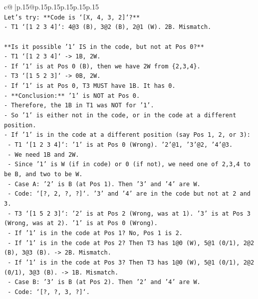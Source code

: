 \documentclass{article}
\begin{document}
{\begin{supertabular}{c@{$\;$}|p{.15\linewidth}@{}p{.15\linewidth}p{.15\linewidth}p{.15\linewidth}p{.15\linewidth}p{.15\linewidth}}
{{{\\ 
\texttt{Let's try: **Code is `{[}X, 4, 3, 2{]}`?**} \\
\texttt{{-} T1 `{[}1 2 3 4{]}`: 4@3 (B), 3@2 (B), 2@1 (W). 2B. Mismatch.} \\
\\ 
\texttt{**Is it possible '1' IS in the code, but not at Pos 0?**} \\
\texttt{{-} T1 `{[}1 2 3 4{]}` {-}> 1B, 2W.} \\
\texttt{{-} If '1' is at Pos 0 (B), then we have 2W from \{2,3,4\}.} \\
\texttt{{-} T3 `{[}1 5 2 3{]}` {-}> 0B, 2W.} \\
\texttt{{-} If '1' is at Pos 0, T3 MUST have 1B. It has 0.} \\
\texttt{{-} **Conclusion:** '1' is NOT at Pos 0.} \\
\texttt{{-} Therefore, the 1B in T1 was NOT for '1'.} \\
\texttt{{-} So '1' is either not in the code, or in the code at a different position.} \\
\texttt{{-} If '1' is in the code at a different position (say Pos 1, 2, or 3):} \\
\texttt{  {-} T1 `{[}1 2 3 4{]}`: '1' is at Pos 0 (Wrong). '2'@1, '3'@2, '4'@3.} \\
\texttt{  {-} We need 1B and 2W.} \\
\texttt{  {-} Since '1' is W (if in code) or 0 (if not), we need one of 2,3,4 to be B, and two to be W.} \\
\texttt{  {-} Case A: '2' is B (at Pos 1). Then '3' and '4' are W.} \\
\texttt{    {-} Code: `{[}?, 2, ?, ?{]}`. '3' and '4' are in the code but not at 2 and 3.} \\
\texttt{    {-} T3 `{[}1 5 2 3{]}`: '2' is at Pos 2 (Wrong, was at 1). '3' is at Pos 3 (Wrong, was at 2). '1' is at Pos 0 (Wrong).} \\
\texttt{    {-} If '1' is in the code at Pos 1? No, Pos 1 is 2.} \\
\texttt{    {-} If '1' is in the code at Pos 2? Then T3 has 1@0 (W), 5@1 (0/1), 2@2 (B), 3@3 (B). {-}> 2B. Mismatch.} \\
\texttt{    {-} If '1' is in the code at Pos 3? Then T3 has 1@0 (W), 5@1 (0/1), 2@2 (0/1), 3@3 (B). {-}> 1B. Mismatch.} \\
\texttt{  {-} Case B: '3' is B (at Pos 2). Then '2' and '4' are W.} \\
\texttt{    {-} Code: `{[}?, ?, 3, ?{]}`.} \\
}}}
\end{supertabular}}
\end{document}
